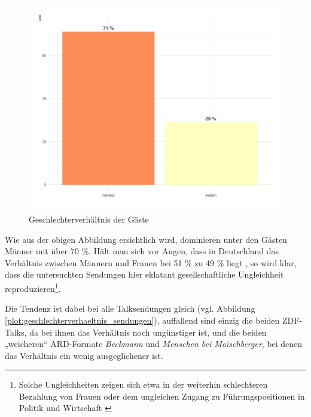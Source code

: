 \begin{figure}[ht]
	\centering
	\includegraphics[width=1\textwidth]{daten/grafiken/plot_geschlechterverhaeltnis_gesamt.png}
	\caption{Geschlechterverhältnis der Gäste}
	\label{plot:geschlechterverhaeltnis_gesamt}
\end{figure}

Wie aus der obigen Abbildung ersichtlich wird, dominieren unter den Gästen Männer mit über 70 \%. Hält man sich vor Augen, dass in Deutschland das Verhältnis zwischen Männern und Frauen bei 51 \% zu 49 \% liegt \parencite{statistischesbundesamtBevoelkerungsstand2011}, so wird klar, dass die untersuchten Sendungen hier eklatant gesellschaftliche Ungleichheit reproduzieren\footnote{Solche Ungleichheiten zeigen sich etwa in der weiterhin schlechteren Bezahlung von Frauen oder dem ungleichen Zugang zu Führungspositionen in Politik und Wirtschaft \parencite{hausmannGlobalGenderGap2012}}.

Die Tendenz ist dabei bei alle Talksendungen gleich (vgl. Abbildung \vref{plot:geschlechterverhaeltnis_sendungen}), auffallend sind einzig die beiden ZDF-Talks, da bei ihnen das Verhältnis noch ungünstiger ist, und die beiden „weicheren“ ARD-Formate \textit{Beckmann} und \textit{Menschen bei Maischberger}, bei denen das Verhältnis ein wenig ausgeglichener ist.

